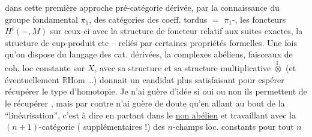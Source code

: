dans cette première approche pré-catégorie dérivée, par la connaissance du groupe fondamental $\pi_1$,  des catégories des coeff.  tordus $=$ $\pi_1$-, les foncteurs $H^i(-,M)$ sur ceux-ci avec la structure de foncteur   relatif aux suites exactes, la structure de cup-produit etc -- reliés par certaines propriétés formelles. Une fois qu'on dispose du langage des cat. dérivées, la  complexes abéliens,   faisceaux de coh. loc constante sur $X$, avec sa structure  et sa structure multiplicative $\overset{\mathbb{L}}{\otimes}$ (et éventuellement $\mathbb{R}\mathrm{Hom}$ \ldots) donnait un candidat plus satisfaisant pour espérer récupérer le type d'homotopie. Je n'ai guère d'idée si oui ou non ils permettent de le récupérer , mais par contre n'ai guère de doute qu'en allant au bout de la ``linéarisation'', c'est à dire en partant dans le \uline{non abélien} et travaillant avec la $(n+1)$-catégorie (  supplémentaires !) des $n$-champs loc. constants  pour tout $n$
